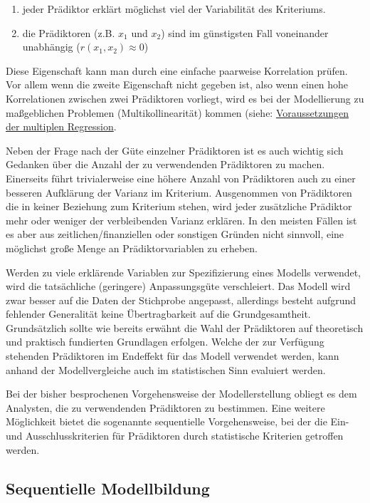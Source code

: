 \documentclass[]{article}
\providecommand{\tightlist}{%
  \setlength{\itemsep}{0pt}\setlength{\parskip}{0pt}}
\begin{document}
\begin{enumerate}
\def\labelenumi{\arabic{enumi}.}
\tightlist
\item
  jeder Prädiktor erklärt möglichst viel der Variabilität des Kriteriums.
\item
  die Prädiktoren (z.B. \(x_1\) und \(x_2\)) sind im günstigsten Fall voneinander unabhängig (\(r(x_1,x_2) \approx 0\))
\end{enumerate}

Diese Eigenschaft kann man durch eine einfache paarweise Korrelation prüfen. Vor allem wenn die zweite Eigenschaft nicht gegeben ist, also wenn einen hohe Korrelationen zwischen zwei Prädiktoren vorliegt, wird es bei der Modellierung zu maßgeblichen Problemen (Multikollinearität) kommen (siehe: \protect\hyperlink{voraussetzungen-der-multiplen-regression}{Voraussetzungen der multiplen Regression}.

Neben der Frage nach der Güte einzelner Prädiktoren ist es auch wichtig sich Gedanken über die Anzahl der zu verwendenden Prädiktoren zu machen. Einerseits führt trivialerweise eine höhere Anzahl von Prädiktoren auch zu einer besseren Aufklärung der Varianz im Kriterium. Ausgenommen von Prädiktoren die in keiner Beziehung zum Kriterium stehen, wird jeder zusätzliche Prädiktor mehr oder weniger der verbleibenden Varianz erklären. In den meisten Fällen ist es aber aus zeitlichen/finanziellen oder sonstigen Gründen nicht sinnvoll, eine möglichst große Menge an Prädiktorvariablen zu erheben.

Werden zu viele erklärende Variablen zur Spezifizierung eines Modells verwendet, wird die tatsächliche (geringere) Anpassungsgüte verschleiert. Das Modell wird zwar besser auf die Daten der Stichprobe angepasst, allerdings besteht aufgrund fehlender Generalität keine Übertragbarkeit auf die Grundgesamtheit.
Grundsätzlich sollte wie bereits erwähnt die Wahl der Prädiktoren auf theoretisch und praktisch fundierten Grundlagen erfolgen. Welche der zur Verfügung stehenden Prädiktoren im Endeffekt für das Modell verwendet werden, kann anhand der Modellvergleiche auch im statistischen Sinn evaluiert werden.

Bei der bisher besprochenen Vorgehensweise der Modellerstellung obliegt es dem Analysten, die zu verwendenden Prädiktoren zu bestimmen. Eine weitere Möglichkeit bietet die sogenannte sequentielle Vorgehensweise, bei der die Ein- und Ausschlusskriterien für Prädiktoren durch statistische Kriterien getroffen werden.

\hypertarget{sequentielle-modellbildung}{%
\subsection*{Sequentielle Modellbildung}\label{sequentielle-modellbildung}}
\end{document}
